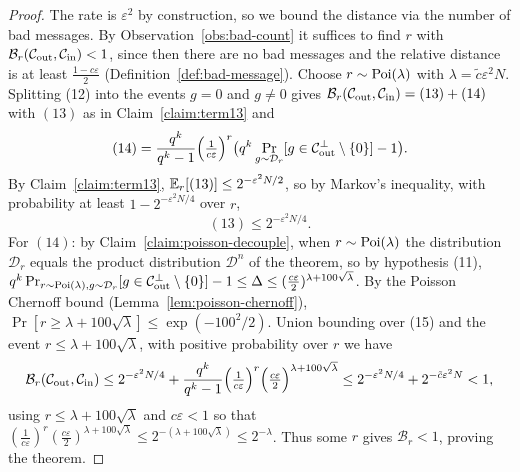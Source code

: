 \begin{proof}
  The rate is $\varepsilon^2$ by construction, so we bound the distance via the
  number of bad messages. By Observation~\ref{obs:bad-count} it suffices to find
  $r$ with $\mathcal{B}_r(\mathcal{C}_{\mathrm{out}},\mathcal{C}_{\mathrm{in}}) < 1$, since then there are no bad messages
  and the relative distance is at least $\frac{1-c\varepsilon}{2}$
  (Definition~\ref{def:bad-message}). Choose $r \sim \operatorname{Poi}(\lambda)$ with
  $\lambda = \tilde c\varepsilon^2 N$. Splitting (12) into the events $g = 0$ and
  $g \neq 0$ gives $\mathcal{B}_r(\mathcal{C}_{\mathrm{out}},\mathcal{C}_{\mathrm{in}}) = (13) + (14)$ with $(13)$ as in
  Claim~\ref{claim:term13} and
  \[
    (14) = \frac{q^k}{q^k-1}\Big(\tfrac{1}{c\varepsilon}\Big)^r
      \big(q^k\Pr_{g\sim\mathcal{D}_r}[g\in\mathcal{C}_{\mathrm{out}}^\perp\setminus\{0\}]-1\big).
  \]
  By Claim~\ref{claim:term13}, $\mathbb{E}_r[(13)]\leq 2^{-\varepsilon^2 N/2}$, so by
  Markov's inequality, with probability at least $1 - 2^{-\varepsilon^2 N/4}$
  over $r$,
  \begin{equation}
    (13)\leq 2^{-\varepsilon^2 N/4}.
    \tag{15}
  \end{equation}
  For $(14)$: by Claim~\ref{claim:poisson-decouple}, when $r \sim \operatorname{Poi}(\lambda)$
  the distribution $\mathcal{D}_r$ equals the product distribution
  $\mathcal{D}^n$ of the theorem, so by hypothesis (11),
  $q^k\Pr_{r\sim\operatorname{Poi}(\lambda),g\sim\mathcal{D}_r}[g\in\mathcal{C}_{\mathrm{out}}^\perp\setminus\{0\}]
  - 1 \leq \Delta \leq (\frac{c\varepsilon}{2})^{\lambda + 100\sqrt\lambda}$. By
  the Poisson Chernoff bound (Lemma~\ref{lem:poisson-chernoff}),
  $\Pr[r \geq \lambda + 100\sqrt\lambda]\leq \exp(-100^2/2)$. Union bounding over
  (15) and the event $r \leq \lambda + 100\sqrt\lambda$, with positive
  probability over $r$ we have
  \[
    \mathcal{B}_r(\mathcal{C}_{\mathrm{out}},\mathcal{C}_{\mathrm{in}})\leq 2^{-\varepsilon^2 N/4}
      + \frac{q^k}{q^k-1}\Big(\tfrac{1}{c\varepsilon}\Big)^r
      \Big(\tfrac{c\varepsilon}{2}\Big)^{\lambda+100\sqrt\lambda}
      \leq 2^{-\varepsilon^2 N/4} + 2^{-\tilde c\varepsilon^2 N} < 1,
  \]
  using $r \leq \lambda + 100\sqrt\lambda$ and $c\varepsilon < 1$ so that
  $(\frac{1}{c\varepsilon})^r(\frac{c\varepsilon}{2})^{\lambda+100\sqrt\lambda}
  \leq 2^{-(\lambda+100\sqrt\lambda)}\leq 2^{-\lambda}$. Thus some $r$ gives
  $\mathcal{B}_r < 1$, proving the theorem.
\end{proof}

